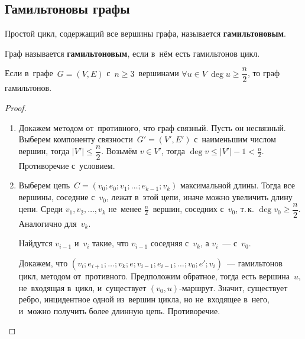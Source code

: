 \subsection{Гамильтоновы графы}
Простой цикл, содержащий все вершины графа, называется \textbf{гамильтоновым}.

Граф называется \textbf{гамильтоновым}, если в~нём есть гамильтонов цикл.

\begin{theorem}[Дирака]
\label{th:Dirac}
Если в~графе~$G = (V, E)$ с~$n \geqslant 3$~вершинами $\forall u \in V \ \deg u \geqslant \dfrac{n}2$, то граф гамильтонов.
\end{theorem}
\begin{proof}
\begin{enumerate}
	\item Докажем методом от~противного, что граф связный.
	Пусть он несвязный.
	Выберем компоненту связности~$G' = (V', E')$ с~наименьшим числом вершин, тогда $|V'| \leqslant \dfrac{n}2$.
	Возьмём $v \in V'$, тогда $\deg v \leqslant |V'| - 1 < \frac{n}2$.
	Противоречие с~условием.
	\item Выберем цепь~$C = (v_0; e_0; v_1; \ldots; e_{k-1}; v_k)$ максимальной длины.
	Тогда все вершины, соседние с~$v_0$, лежат в~этой цепи, иначе можно увеличить длину цепи.
	Среди $v_1, v_2, \ldots, v_k$ не~менее $\frac{n}2$~вершин, соседних с~$v_0$, т.\,к. $\deg v_0 \geqslant \dfrac{n}2$.
	Аналогично для~$v_k$.
	
	Найдутся $v_{i-1}$ и~$v_i$ такие, что $v_{i-1}$ соседняя с~$v_k$, а $v_i$~--- с~$v_0$.
	
	Докажем, что $(v_i; e_{i+1}; \ldots; v_k; e; v_{i-1}; e_{i-1}; \ldots; v_0; e'; v_i)$~--- гамильтонов цикл, методом от~противного.
	Предположим обратное, тогда есть вершина~$u$, не~входящая в~цикл, и~существует $(v_0, u)$\nobreakdash-\hspace{0pt}маршрут.
	Значит, существует ребро, инцидентное одной из~вершин цикла, но не~входящее в~него, и~можно получить более длинную цепь.
	Противоречие.
\end{enumerate}
\end{proof}

